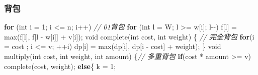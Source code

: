 \documentclass[
]{article}
\newenvironment{Shaded}{}{}
\newcommand{\CommentTok}[1]{\textcolor[rgb]{0.38,0.63,0.69}{\textit{#1}}}
\newcommand{\ControlFlowTok}[1]{\textcolor[rgb]{0.00,0.44,0.13}{\textbf{#1}}}
\newcommand{\DataTypeTok}[1]{\textcolor[rgb]{0.56,0.13,0.00}{#1}}
\newcommand{\DecValTok}[1]{\textcolor[rgb]{0.25,0.63,0.44}{#1}}
\newcommand{\NormalTok}[1]{#1}
\newcommand{\OperatorTok}[1]{\textcolor[rgb]{0.40,0.40,0.40}{#1}}
\begin{document}
\hypertarget{ux80ccux5305}{%
\subsubsection{背包}\label{ux80ccux5305}}

\begin{Shaded}
\begin{Highlighting}[]
\ControlFlowTok{for} \OperatorTok{(}\DataTypeTok{int}\NormalTok{ i }\OperatorTok{=} \DecValTok{1}\OperatorTok{;}\NormalTok{ i }\OperatorTok{\textless{}=}\NormalTok{ n}\OperatorTok{;}\NormalTok{ i}\OperatorTok{++)} \CommentTok{// 01背包}
  \ControlFlowTok{for} \OperatorTok{(}\DataTypeTok{int}\NormalTok{ l }\OperatorTok{=}\NormalTok{ W}\OperatorTok{;}\NormalTok{ l }\OperatorTok{\textgreater{}=}\NormalTok{ w}\OperatorTok{[}\NormalTok{i}\OperatorTok{];}\NormalTok{ l}\OperatorTok{{-}{-})}\NormalTok{ f}\OperatorTok{[}\NormalTok{l}\OperatorTok{]} \OperatorTok{=}\NormalTok{ max}\OperatorTok{(}\NormalTok{f}\OperatorTok{[}\NormalTok{l}\OperatorTok{],}\NormalTok{ f}\OperatorTok{[}\NormalTok{l }\OperatorTok{{-}}\NormalTok{ w}\OperatorTok{[}\NormalTok{i}\OperatorTok{]]} \OperatorTok{+}\NormalTok{ v}\OperatorTok{[}\NormalTok{i}\OperatorTok{]);}
\DataTypeTok{void}\NormalTok{ complete}\OperatorTok{(}\DataTypeTok{int}\NormalTok{ cost}\OperatorTok{,} \DataTypeTok{int}\NormalTok{ weight}\OperatorTok{)}  \OperatorTok{\{}   \CommentTok{//  完全背包}
    \ControlFlowTok{for}\OperatorTok{(}\NormalTok{i }\OperatorTok{=}\NormalTok{ cost }\OperatorTok{;}\NormalTok{ i }\OperatorTok{\textless{}=}\NormalTok{ v}\OperatorTok{;} \OperatorTok{++}\NormalTok{i}\OperatorTok{)}  
\NormalTok{    dp}\OperatorTok{[}\NormalTok{i}\OperatorTok{]} \OperatorTok{=}\NormalTok{ max}\OperatorTok{(}\NormalTok{dp}\OperatorTok{[}\NormalTok{i}\OperatorTok{],}\NormalTok{ dp}\OperatorTok{[}\NormalTok{i }\OperatorTok{{-}}\NormalTok{ cost}\OperatorTok{]} \OperatorTok{+}\NormalTok{ weight}\OperatorTok{);}  
\OperatorTok{\}}  
\DataTypeTok{void}\NormalTok{ multiply}\OperatorTok{(}\DataTypeTok{int}\NormalTok{ cost}\OperatorTok{,} \DataTypeTok{int}\NormalTok{ weight}\OperatorTok{,} \DataTypeTok{int}\NormalTok{ amount}\OperatorTok{)}  \OperatorTok{\{}\CommentTok{//  多重背包  }
    \ControlFlowTok{if}\OperatorTok{(}\NormalTok{cost }\OperatorTok{*}\NormalTok{ amount }\OperatorTok{\textgreater{}=}\NormalTok{ v}\OperatorTok{)}  
\NormalTok{        complete}\OperatorTok{(}\NormalTok{cost}\OperatorTok{,}\NormalTok{ weight}\OperatorTok{);}  
    \ControlFlowTok{else}\OperatorTok{\{}  
\NormalTok{        k }\OperatorTok{=} \DecValTok{1}\OperatorTok{;}  

\end{Highlighting}
\end{Shaded}
\end{document}
